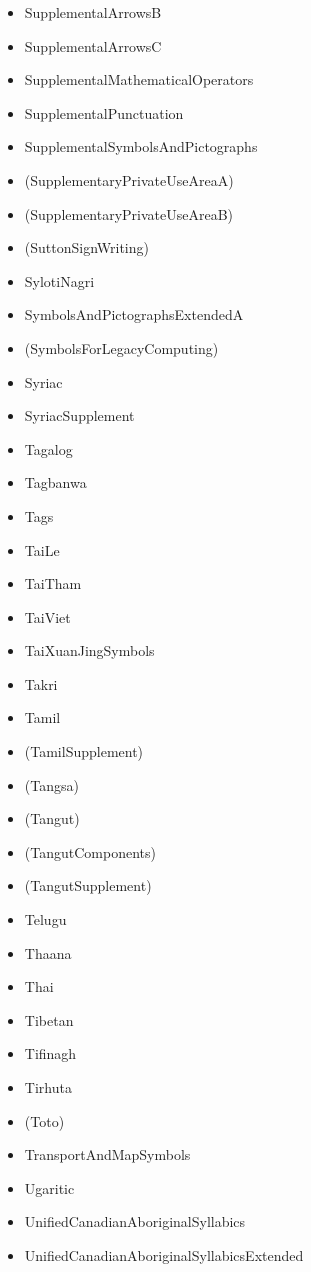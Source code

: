 \documentclass{article}
\newenvironment{itemlist}{%
  \begin{itemize}
  \setlength{\itemsep}{0pt}
  \setlength{\parsep}{0pt}
  \setlength{\topsep}{0pt}
  \setlength{\partopsep}{0pt}
  \setlength{\parskip}{0pt}
  \setlength{\labelsep}{5pt}}%
{
  \end{itemize}}
\begin{document}
\begin{multicols*}{2}
\begin{itemlist}
        \item SupplementalArrowsB
        \item SupplementalArrowsC
        \item SupplementalMathematicalOperators
        \item SupplementalPunctuation
        \item SupplementalSymbolsAndPictographs
        \item (SupplementaryPrivateUseAreaA)
        \item (SupplementaryPrivateUseAreaB)
        \item (SuttonSignWriting)
        \item SylotiNagri
        \item SymbolsAndPictographsExtendedA
        \item (SymbolsForLegacyComputing)
        \item Syriac
        \item SyriacSupplement
        \item Tagalog
        \item Tagbanwa
        \item Tags
        \item TaiLe
        \item TaiTham
        \item TaiViet
        \item TaiXuanJingSymbols
        \item Takri
        \item Tamil
        \item (TamilSupplement)
        \item (Tangsa)
        \item (Tangut)
        \item (TangutComponents)
        \item (TangutSupplement)
        \item Telugu
        \item Thaana
        \item Thai
        \item Tibetan
        \item Tifinagh
        \item Tirhuta
        \item (Toto)
        \item TransportAndMapSymbols
        \item Ugaritic
        \item UnifiedCanadianAboriginalSyllabics
        \item UnifiedCanadianAboriginalSyllabicsExtended

\end{itemlist}
\end{multicols*}
\end{document}
